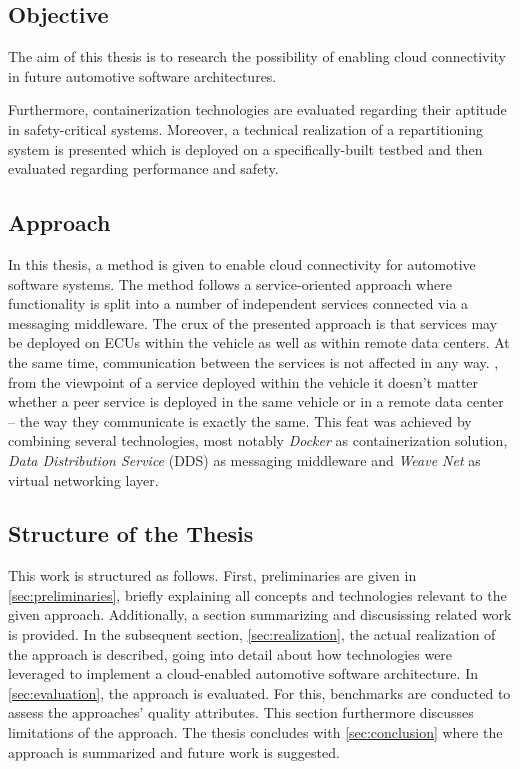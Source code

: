 \subsection{Objective}

The aim of this thesis is to research the possibility of enabling cloud connectivity in future automotive software architectures.
 
Furthermore, containerization technologies are evaluated regarding their aptitude in safety-critical systems. Moreover, a technical realization of a repartitioning system is presented which is deployed on a specifically-built testbed and then evaluated regarding performance and safety.

%
%
%
%
%
%
%
%
%
%

\subsection{Approach}

In this thesis, a method is given to enable cloud connectivity for automotive software systems. 
The method follows a service-oriented approach where functionality is split into a number of independent services connected via a messaging middleware. 
The crux of the presented approach is that services may be deployed on ECUs within the vehicle as well as within remote data centers. At the same time, communication between the services is not affected in any way. \Ie , from the viewpoint of a service deployed within the vehicle it doesn't matter whether a peer service is deployed in the same vehicle or in a remote data center -- the way they communicate is exactly the same.
This feat was achieved by combining several technologies, most notably \emph{Docker}\cite{DockerWebsite} as containerization solution, \emph{Data Distribution Service} (DDS) as messaging middleware and \emph{Weave Net}\cite{WeavenetWebsite} as virtual networking layer.

%
%
%
%
%
%
%
%
%
%

\subsection{Structure of the Thesis}

This work is structured as follows. First, preliminaries are given in \cref{sec:preliminaries}, briefly explaining all concepts and technologies relevant to the given approach. Additionally, a section summarizing and discusissing related work is provided. In the subsequent section, \cref{sec:realization}, the actual realization of the approach is described, going into detail about how technologies were leveraged to implement a cloud-enabled automotive software architecture. In \cref{sec:evaluation}, the approach is evaluated. For this, benchmarks are conducted to assess the approaches' quality attributes. This section furthermore discusses limitations of the approach. The thesis concludes with \cref{sec:conclusion} where the approach is summarized and future work is suggested.

%
%
%
%
%
%
%
%
%
%
%
%
%
%
%
%
%
%
%
%
%
%
%
%
%
%
%
%
%
%
%
%
%
%
%
%
%
%
